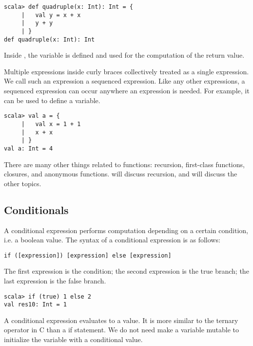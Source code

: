 \begin{verbatim}
scala> def quadruple(x: Int): Int = {
     |   val y = x + x
     |   y + y
     | }
def quadruple(x: Int): Int
\end{verbatim}

Inside , the variable  is defined and used for the
computation of
the return value.

Multiple expressions inside curly braces collectively treated as a single
expression. We call such an expression a sequenced expression. Like any other
expressions, a sequenced expression can occur anywhere an expression is needed.
For example, it can be used to define a variable.

\begin{verbatim}
scala> val a = {
     |   val x = 1 + 1
     |   x + x
     | }
val a: Int = 4
\end{verbatim}

There are many other things related to functions: recursion, first-class
functions, closures, and anonymous functions.  will
discuss recursion, and  will discuss the other topics.

\subsection{Conditionals}

A conditional expression performs computation depending on a certain
condition, i.e. a boolean value. The syntax of a conditional expression is as
follows:

\begin{verbatim}
if ([expression]) [expression] else [expression]
\end{verbatim}

The first expression is the condition; the second expression is the true branch;
the last expression is the false branch.

\begin{verbatim}
scala> if (true) 1 else 2
val res10: Int = 1
\end{verbatim}

A conditional expression evaluates to a value. It is more similar to the ternary
operator  in C than a if statement.
We do not need make a variable
mutable to initialize the variable with a conditional value.

